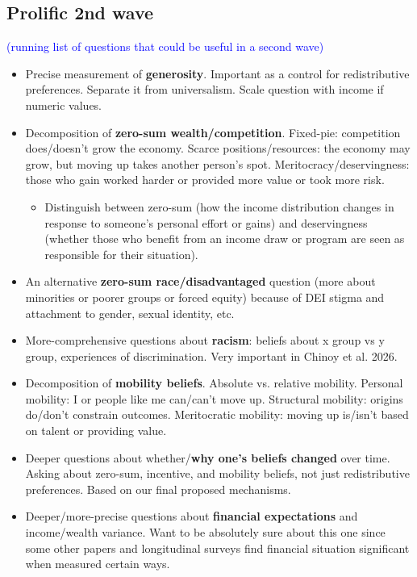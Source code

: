 \documentclass{article}
\newcommand{\blue}[1]{\textcolor{blue}{#1}}
\begin{document}
\subsection*{Prolific 2nd wave}

\blue{(running list of questions that could be useful in a second wave)}
\begin{itemize}
    \item Precise measurement of \textbf{generosity}. Important as a control for redistributive preferences. Separate it from universalism. Scale question with income if numeric values. 
    \item Decomposition of \textbf{zero-sum wealth/competition}. Fixed-pie: competition does/doesn't grow the economy. Scarce positions/resources: the economy may grow, but moving up takes another person's spot. Meritocracy/deservingness: those who gain worked harder or provided more value or took more risk.
    \begin{itemize}
        \item Distinguish between zero-sum (how the income distribution changes in response to someone's personal effort or gains) and deservingness (whether those who benefit from an income draw or program are seen as responsible for their situation).
    \end{itemize}
    \item An alternative \textbf{zero-sum race/disadvantaged} question (more about minorities or poorer groups or forced equity) because of DEI stigma and attachment to gender, sexual identity, etc.
    \item More-comprehensive questions about \textbf{racism}: beliefs about x group vs y group, experiences of discrimination. Very important in Chinoy et al. 2026.
    \item Decomposition of \textbf{mobility beliefs}. Absolute vs. relative mobility.  Personal mobility: I or people like me can/can't move up. Structural mobility: origins do/don't constrain outcomes. Meritocratic mobility: moving up is/isn't based on talent or providing value.
    \item Deeper questions about whether/\textbf{why one's beliefs changed} over time. Asking about zero-sum, incentive, and mobility beliefs, not just redistributive preferences. Based on our final proposed mechanisms.
    \item Deeper/more-precise questions about \textbf{financial expectations} and income/wealth variance. Want to be absolutely sure about this one since some other papers and longitudinal surveys find financial situation significant when measured certain ways.

\end{itemize}
\end{document}
